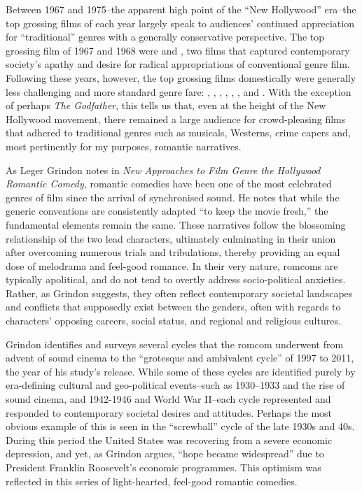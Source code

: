 Between 1967 and 1975–the apparent high point of the “New Hollywood” era–the top grossing films of each year largely speak to audiences’ continued appreciation for “traditional” genres with a generally conservative perspective.
The top grossing film of 1967 and 1968 were \textcite{nichols_graduate_1967} and \textcite{kubrick_2001_1968}, two films that captured contemporary society’s apathy and desire for radical appropriations of conventional genre film.
Following these years, however, the top grossing films domestically were generally less challenging and more standard genre fare:
\textcite{hill_butch_1969}, \textcite{hiller_love_1970}, \textcite{jewison_fiddler_1971}, \textcite{coppola_godfather_1972}, \textcite{hill_sting_1973}, \textcite{brooks_blazing_1974}, and \textcite{spielberg_jaws_1975}.\autocite[][]{noauthor_all-time_nodate}
With the exception of perhaps \textit{The Godfather}, this tells us that, even at the height of the New Hollywood movement, there remained a large audience for crowd-pleasing films that adhered to traditional genres such as musicals, Westerns, crime capers and, most pertinently for my purposes, romantic narratives.

As Leger Grindon notes in \textit{New Approaches to Film Genre the Hollywood Romantic Comedy}, romantic comedies have been one of the most celebrated genres of film since the arrival of synchronised sound.\autocite[][25]{grindon_hollywood_2011}
He notes that while the generic conventions are consistently adapted “to keep the movie fresh,” the fundamental elements remain the same.\autocite[][2]{grindon_hollywood_2011}
These narratives follow the blossoming relationship of the two lead characters, ultimately culminating in their union after overcoming numerous trials and tribulations, thereby providing an equal dose of melodrama and feel-good romance.
In their very nature, romcoms are typically apolitical, and do not tend to overtly address socio-political anxieties.
Rather, as Grindon suggests, they often reflect contemporary societal landscapes and conflicts that supposedly exist between the genders, often with regards to characters’ opposing careers, social status, and regional and religious cultures.\autocite[][4-5]{grindon_hollywood_2011}

Grindon identifies and surveys several cycles that the romcom underwent from advent of sound cinema to the “grotesque and ambivalent cycle” of 1997 to 2011, the year of his study’s release.\autocite[][26-66]{grindon_hollywood_2011}
While some of these cycles are identified purely by era-defining cultural and geo-political events–such as 1930–1933 and the rise of sound cinema, and 1942-1946 and World War II–each cycle represented and responded to contemporary societal desires and attitudes.
Perhaps the most obvious example of this is seen in the “screwball” cycle of the late 1930s and 40s.
During this period the United States was recovering from a severe economic depression, and yet, as Grindon argues, “hope became widespread” due to President Franklin Roosevelt’s economic programmes.\autocite[][32]{grindon_hollywood_2011}
This optimism was reflected in this series of light-hearted, feel-good romantic comedies.

